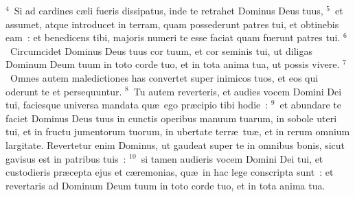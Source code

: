 ${}^{4}$~Si ad cardines c\ae li fueris dissipatus, inde te retrahet Dominus Deus tuus,
${}^{5}$~et assumet, atque introducet in terram, quam possederunt patres tui, et obtinebis eam~: et benedicens tibi, majoris numeri te esse faciat quam fuerunt patres tui.
${}^{6}$~Circumcidet Dominus Deus tuus cor tuum, et cor seminis tui, ut diligas Dominum Deum tuum in toto corde tuo, et in tota anima tua, ut possis vivere.
${}^{7}$~Omnes autem maledictiones has convertet super inimicos tuos, et eos qui oderunt te et persequuntur.
${}^{8}$~Tu autem reverteris, et audies vocem Domini Dei tui, faciesque universa mandata qu\ae\ ego pr\ae cipio tibi hodie~:
${}^{9}$~et abundare te faciet Dominus Deus tuus in cunctis operibus manuum tuarum, in sobole uteri tui, et in fructu jumentorum tuorum, in ubertate terr\ae\ tu\ae , et in rerum omnium largitate. Revertetur enim Dominus, ut gaudeat super te in omnibus bonis, sicut gavisus est in patribus tuis~:
${}^{10}$~si tamen audieris vocem Domini Dei tui, et custodieris pr\ae cepta ejus et c\ae remonias, qu\ae\ in hac lege conscripta sunt~: et revertaris ad Dominum Deum tuum in toto corde tuo, et in tota anima tua.


